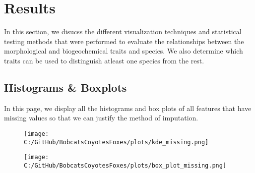 \documentclass[a4paper]{article}
\begin{document}
\newpage

\section{Results}
In this section, we disucss the different visualization techniques and statistical testing methods that were performed to evaluate the relationships between
the morphological and biogeochemical traits and species. We also determine which traits can be used to distinguish atleast one species from the rest.

\subsection{Histograms \& Boxplots}
In this page, we display all the histograms and box plots of all features that have missing values so that we can justify the method of imputation. 
\vspace{0.5cm}

\begin{figure}[h]
    \centering
    \begin{minipage}{0.63\textwidth}
        \centering
        \texttt{[image: C:/GitHub/BobcatsCoyotesFoxes/plots/kde\_missing.png]}
    \end{minipage}
    \vspace{0.5cm}
    \begin{minipage}{0.63\textwidth}
        \centering
        \texttt{[image: C:/GitHub/BobcatsCoyotesFoxes/plots/box\_plot\_missing.png]}
    \end{minipage}
\end{figure}



\newpage
\end{document}
